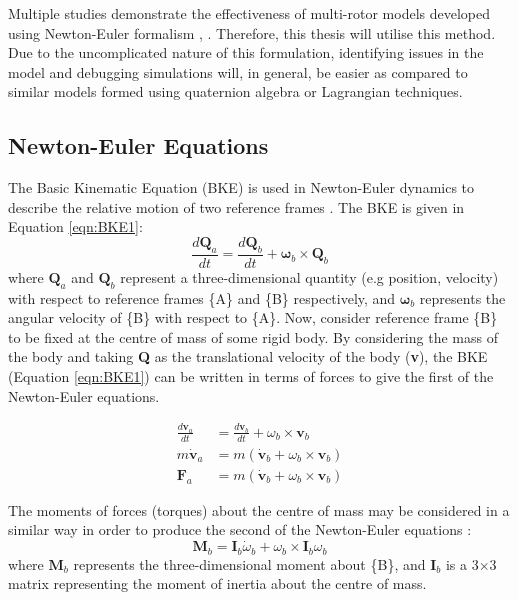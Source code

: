 Multiple studies demonstrate the effectiveness of multi-rotor models developed using Newton-Euler formalism \cite{Bouabdallah2006}, \cite{Baranek2012}. Therefore, this thesis will utilise this method. Due to the uncomplicated nature of this formulation, identifying issues in the model and debugging simulations will, in general, be easier as compared to similar models formed using quaternion algebra or Lagrangian techniques.



\subsection{Newton-Euler Equations}
The Basic Kinematic Equation (BKE) is used in Newton-Euler dynamics to describe the relative motion of two reference frames \cite{Ardema2006}. The BKE is given in Equation \ref{eqn:BKE1}:
\begin{equation}\label{eqn:BKE1} 
\frac{d\textbf{Q}_{a}}{dt}=\frac{d\textbf{Q}_{b}}{dt}+\mathbf{\omega}_{b} \times \textbf{Q}_{b}
\end{equation}
where $\textbf{Q}_{a}$ and $\textbf{Q}_{b}$ represent a three-dimensional quantity (e.g position, velocity) with respect to reference frames \{A\} and \{B\} respectively, and $\mathbf\omega_{b}$ represents the angular velocity of \{B\} with respect to \{A\}. Now, consider reference frame \{B\} to be fixed at the centre of mass of some rigid body. By considering the mass of the body and taking \textbf{Q} as the translational velocity of the body (\textbf{v}), the BKE (Equation \ref{eqn:BKE1}) can be written in terms of forces to give the first of the Newton-Euler equations.

\begin{equation*}
\begin{split} 
\frac{d\textbf{v}_{a}}{dt}&=\frac{d\textbf{v}_{b}}{dt}+\omega_{b} \times \textbf{v}_{b}\\
m\dot{\textbf{v}}_{a}&=m(\dot{\textbf{v}}_{b}+\omega_{b} \times \textbf{v}_{b})\\
\textbf{F}_{a}&=m(\dot{\textbf{v}}_{b}+\omega_{b}\times\textbf{v}_{b})
\end{split}
\end{equation*}

The moments of forces (torques) about the centre of mass may be considered in a similar way in order to produce the second of the Newton-Euler equations \cite{Ardema2006}:
\begin{equation*}
\textbf{M}_{b}=\textbf{I}_{b}\dot{\omega}_{b}+\omega_{b}\times\textbf{I}_{b}\omega_{b}
\end{equation*}
where $\textbf{M}_{b}$ represents the three-dimensional moment about \{B\}, and $\textbf{I}_{b}$ is a 3$\times$3 matrix representing the moment of inertia about the centre of mass.

